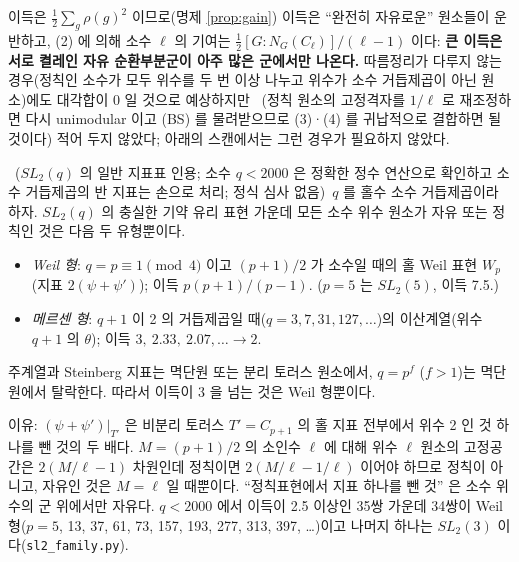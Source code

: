 \noindent 이득은 $\tfrac12\sum_g\rho(g)^2$ 이므로(명제 \ref{prop:gain}) 이득은 ``완전히 자유로운'' 원소들이 운반하고, (2) 에 의해 소수 $\ell$ 의 기여는 $\tfrac12[G:N_G(C_\ell)]/(\ell-1)$ 이다: \textbf{큰 이득은 서로 켤레인 자유 순환부분군이 아주 많은 군에서만 나온다.} 따름정리가 다루지 않는 경우(정칙인 소수가 모두 위수를 두 번 이상 나누고 위수가 소수 거듭제곱이 아닌 원소)에도 대각합이 0 일 것으로 예상하지만 \tagH\ (정칙 원소의 고정격자를 $1/\ell$ 로 재조정하면 다시 unimodular 이고 (BS) 를 물려받으므로 (3)·(4) 를 귀납적으로 결합하면 될 것이다) 적어 두지 않았다; 아래의 스캔에서는 그런 경우가 필요하지 않았다.

\begin{proposition}[$SL_2(q)$ 족의 분석]\label{prop:sl2q}\tagP\ ($SL_2(q)$ 의 일반 지표표 인용; 소수 $q<2000$ 은 정확한 정수 연산으로 확인하고 소수 거듭제곱의 반 지표는 손으로 처리; 정식 심사 없음)\
$q$ 를 홀수 소수 거듭제곱이라 하자. $SL_2(q)$ 의 충실한 기약 유리 표현 가운데 모든 소수 위수 원소가 자유 또는 정칙인 것은 다음 두 유형뿐이다.
\begin{itemize}
\item \emph{Weil 형}: $q=p\equiv1\pmod4$ 이고 $(p+1)/2$ 가 소수일 때의 홀 Weil 표현 $W_p$ (지표 $2(\psi+\psi')$); 이득 $p(p+1)/(p-1)$. ($p=5$ 는 $SL_2(5)$, 이득 7.5.)
\item \emph{메르센 형}: $q+1$ 이 2 의 거듭제곱일 때($q=3,7,31,127,\dots$)의 이산계열(위수 $q+1$ 의 $\theta$); 이득 $3,\ 2.33,\ 2.07,\dots\to2$.
\end{itemize}
주계열과 Steinberg 지표는 멱단원 또는 분리 토러스 원소에서, $q=p^f$ ($f>1$)는 멱단원에서 탈락한다. 따라서 이득이 3 을 넘는 것은 Weil 형뿐이다.
\end{proposition}
\noindent 이유: $(\psi+\psi')|_{T'}$ 은 비분리 토러스 $T'=C_{p+1}$ 의 홀 지표 전부에서 위수 2 인 것 하나를 뺀 것의 두 배다. $M=(p+1)/2$ 의 소인수 $\ell$ 에 대해 위수 $\ell$ 원소의 고정공간은 $2(M/\ell-1)$ 차원인데 정칙이면 $2(M/\ell-1/\ell)$ 이어야 하므로 정칙이 아니고, 자유인 것은 $M=\ell$ 일 때뿐이다. ``정칙표현에서 지표 하나를 뺀 것'' 은 소수 위수의 군 위에서만 자유다. $q<2000$ 에서 이득이 2.5 이상인 35쌍 가운데 34쌍이 Weil 형($p=5$, 13, 37, 61, 73, 157, 193, 277, 313, 397, \dots)이고 나머지 하나는 $SL_2(3)$ 이다(\texttt{sl2\_family.py}).

